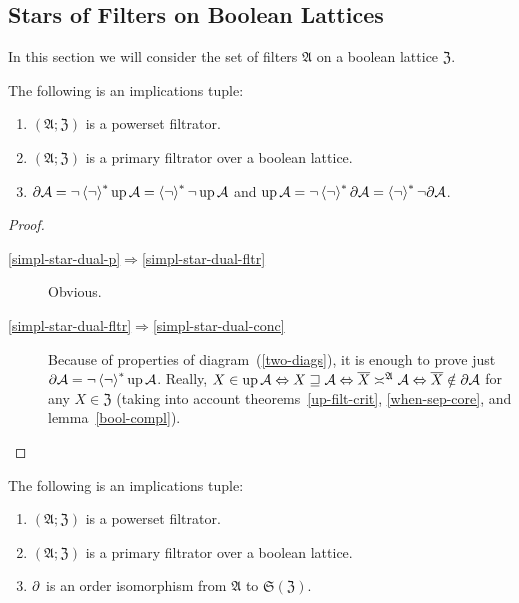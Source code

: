 \subsection{Stars of Filters on Boolean Lattices}

In this section we will consider the set of filters $\mathfrak{A}$
on a boolean lattice $\mathfrak{Z}$.
\begin{thm}
\label{f-simpl-star-dual}The following is an implications tuple:
\begin{enumerate}
\item \label{simpl-star-dual-p}$(\mathfrak{A};\mathfrak{Z})$ is a powerset
filtrator.
\item \label{simpl-star-dual-fltr}$(\mathfrak{A};\mathfrak{Z})$ is a primary
filtrator over a boolean lattice.
\item \label{simpl-star-dual-conc}$\partial\mathcal{A}=\lnot\left\langle \lnot\right\rangle ^{\ast}\operatorname{up}\mathcal{A}=\left\langle \lnot\right\rangle ^{\ast}\lnot\operatorname{up}\mathcal{A}$
and $\operatorname{up}\mathcal{A}=\lnot\left\langle \lnot\right\rangle ^{\ast}\partial\mathcal{A}=\left\langle \lnot\right\rangle ^{\ast}\lnot\partial\mathcal{A}$.
\end{enumerate}
\end{thm}
\begin{proof}
~
\begin{description}
\item [{\ref{simpl-star-dual-p}$\Rightarrow$\ref{simpl-star-dual-fltr}}] Obvious.
\item [{\ref{simpl-star-dual-fltr}$\Rightarrow$\ref{simpl-star-dual-conc}}] Because
of properties of diagram~(\ref{two-diags}), it is enough to prove
just $\partial\mathcal{A}=\lnot\left\langle \lnot\right\rangle ^{\ast}\operatorname{up}\mathcal{A}$. Really,
$X\in\operatorname{up}\mathcal{A}\Leftrightarrow X\sqsupseteq\mathcal{A}\Leftrightarrow\overline{X}\asymp^{\mathfrak{A}}\mathcal{A}\Leftrightarrow\overline{X}\notin\partial\mathcal{A}$
for any $X\in\mathfrak{Z}$ (taking into account theorems~\ref{up-filt-crit},
\ref{when-sep-core}, and lemma~\ref{bool-compl}).
\end{description}
\end{proof}
\begin{cor}
\label{d-inj}The following is an implications tuple:
\begin{enumerate}
\item $(\mathfrak{A};\mathfrak{Z})$ is a powerset filtrator.
\item $(\mathfrak{A};\mathfrak{Z})$ is a primary filtrator over a boolean
lattice.
\item $\partial$ is an order isomorphism from $\mathfrak{A}$ to $\mathfrak{S}(\mathfrak{Z})$.
\end{enumerate}
\end{cor}
